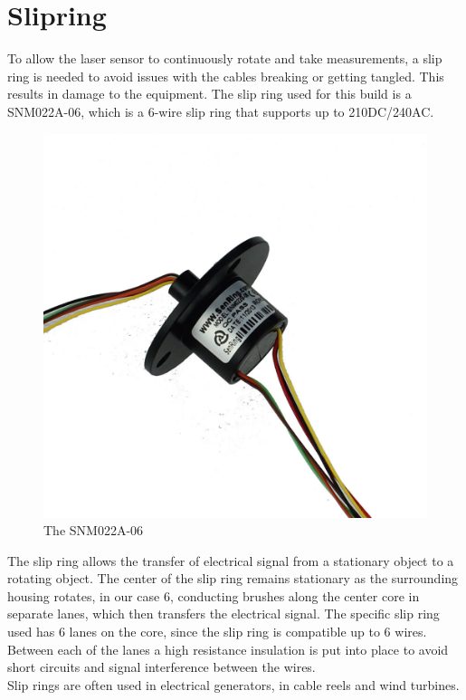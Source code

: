 \clearpage
\section{Slipring}

To allow the laser sensor to continuously rotate and take measurements, a slip ring is needed to avoid issues with the cables breaking or getting tangled. This results in damage to the equipment. 
The slip ring used for this build is a SNM022A-06\cite{slipring}, which is a 6-wire slip ring that supports up to 210DC/240AC. 

\begin{figure}[H]
	\centering
	\includegraphics[width=.5\linewidth]{images/slipring-pic.jpg}
	\caption{The SNM022A-06}
	\label{slipringpic}	
\end{figure}

The slip ring allows the transfer of electrical signal from a stationary object to a rotating object. The center of the slip ring remains stationary as the surrounding housing rotates, in our case 6, conducting brushes along the center core in separate lanes, which then transfers the electrical signal.
The specific slip ring used has 6 lanes on the core, since the slip ring is compatible up to 6 wires. Between each of the lanes a high resistance insulation is put into place to avoid short circuits and signal interference between the wires.\cite{slipringhow} \\
Slip rings are often used in electrical generators, in cable reels and wind turbines.



